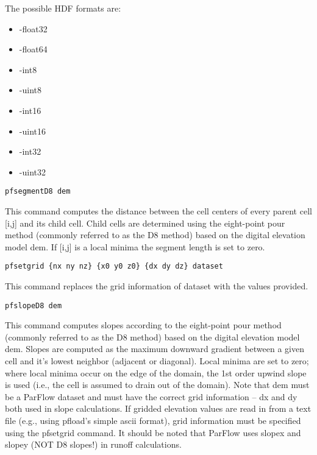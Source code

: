 \begin{description}
The possible HDF formats are:
\begin{itemize}
\item{-float32}
\item{-float64}
\item{-int8}
\item{-uint8}
\item{-int16}
\item{-uint16}
\item{-int32}
\item{-uint32}
\end{itemize}


\item{\begin{verbatim}pfsegmentD8 dem\end{verbatim}}
This command computes the distance between the cell centers of every parent cell [i,j]
and its child cell. Child cells are determined using the eight-point pour method (commonly
referred to as the D8 method) based on the digital elevation model dem. If [i,j] is a
local minima the segment length is set to zero.

\item{\begin{verbatim}pfsetgrid {nx ny nz} {x0 y0 z0} {dx dy dz} dataset\end{verbatim}}
This command replaces the grid information of dataset with the values provided.

\item{\begin{verbatim}pfslopeD8 dem\end{verbatim}}
This command computes slopes according to the eight-point pour method (commonly
referred to as the D8 method) based on the digital elevation model dem. Slopes
are computed as the maximum downward gradient between a given cell and it's lowest
neighbor (adjacent or diagonal). Local minima are set to zero; where local minima
occur on the edge of the domain, the 1st order upwind slope is used (i.e., the cell
is assumed to drain out of the domain). Note that dem must be a ParFlow dataset and
must have the correct grid information -- dx and dy both used in slope calculations.
If gridded elevation values are read in from a text file (e.g., using pfload's simple
ascii format), grid information must be specified using the pfsetgrid command. It should be noted that ParFlow uses slopex and slopey (NOT D8 slopes!) in runoff calculations.



\end{description}
